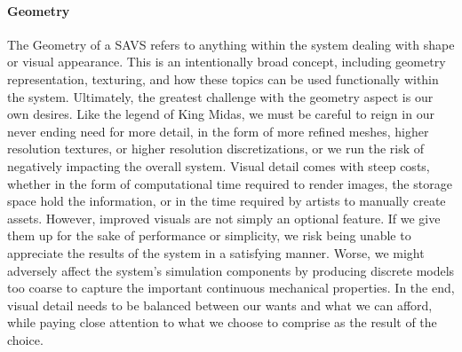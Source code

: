 \paragraph{Geometry} The Geometry of a SAVS refers to anything within the
  system dealing with shape or visual appearance. This is an
  intentionally broad concept, including geometry representation,
  texturing, and how these topics can be used functionally within the
  system. Ultimately, the greatest challenge with the geometry aspect
  is our own desires. Like the legend of King Midas, we must be
  careful to reign in our never ending need for more detail, in the
  form of more refined meshes, higher resolution textures, or higher
  resolution discretizations, or we run the risk of negatively
  impacting the overall system. Visual detail comes with steep costs,
  whether in the form of computational time required to render images,
  the storage space hold the information, or in the time required by
  artists to manually create assets. However, improved visuals are not
  simply an optional feature. If we give them up for the sake of
  performance or simplicity, we risk being unable to appreciate the
  results of the system in a satisfying manner. Worse, we might
  adversely affect the system's simulation components by producing
  discrete models too coarse to capture the important continuous
  mechanical properties. In the end, visual detail needs to be
  balanced between our wants and what we can afford, while paying
  close attention to what we choose to comprise as the result of the
  choice.

